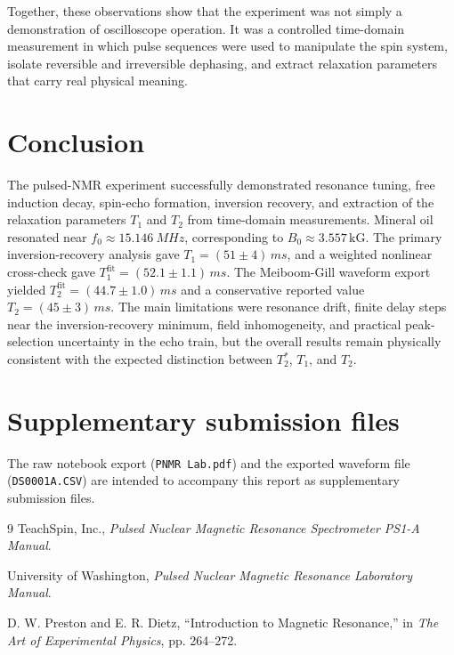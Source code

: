\documentclass[11pt]{article}
\begin{document}
Together, these observations show that the experiment was not simply a demonstration of oscilloscope operation. It was a controlled time-domain measurement in which pulse sequences were used to manipulate the spin system, isolate reversible and irreversible dephasing, and extract relaxation parameters that carry real physical meaning.

\section{Conclusion}

The pulsed-NMR experiment successfully demonstrated resonance tuning, free induction decay, spin-echo formation, inversion recovery, and extraction of the relaxation parameters $T_1$ and $T_2$ from time-domain measurements. Mineral oil resonated near $f_0 \approx \SI{15.146}{MHz}$, corresponding to $B_0 \approx 3.557\,\mathrm{kG}$. The primary inversion-recovery analysis gave $T_1 = (51 \pm 4)\,\si{ms}$, and a weighted nonlinear cross-check gave $T_1^{\mathrm{fit}} = (52.1 \pm 1.1)\,\si{ms}$. The Meiboom-Gill waveform export yielded $T_2^{\mathrm{fit}} = (44.7 \pm 1.0)\,\si{ms}$ and a conservative reported value $T_2 = (45 \pm 3)\,\si{ms}$. The main limitations were resonance drift, finite delay steps near the inversion-recovery minimum, field inhomogeneity, and practical peak-selection uncertainty in the echo train, but the overall results remain physically consistent with the expected distinction between $T_2^\ast$, $T_1$, and $T_2$.

\section*{Supplementary submission files}
The raw notebook export (\texttt{PNMR Lab.pdf}) and the exported waveform file (\texttt{DS0001A.CSV}) are intended to accompany this report as supplementary submission files.

\begin{thebibliography}{9}
TeachSpin, Inc., \emph{Pulsed Nuclear Magnetic Resonance Spectrometer PS1-A Manual}.

University of Washington, \emph{Pulsed Nuclear Magnetic Resonance Laboratory Manual}.

D. W. Preston and E. R. Dietz, ``Introduction to Magnetic Resonance,'' in \emph{The Art of Experimental Physics}, pp. 264--272.
\end{thebibliography}
\end{document}
